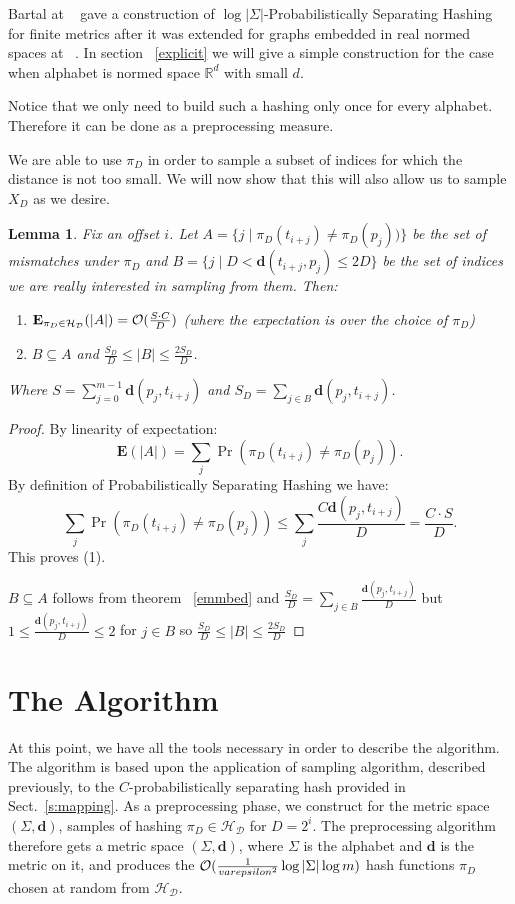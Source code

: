 \documentclass[11pt]{article}
\newcommand{\calO}{{\cal{O}}}
\newtheorem{lem}[thm]{Lemma}
\newcommand{\envert}[1]{\left\lvert#1\right\rvert}
\let\abs=\envert
\newcommand{\bfE}{\textbf{E}}
\newcommand{\dist}{\textbf{d}}
\begin{document}
Bartal at ~\cite{Bar96} gave a construction of $\log
\abs{\Sigma}$-{Probabilistically Separating Hashing } for finite
metrics after it was extended for graphs embedded in real normed
spaces at ~\cite{CCGGP98}. In section ~\ref{explicit} we will give
a simple construction for the case when alphabet is normed space
$\mathbb{R}^d$ with small $d$.

Notice that we only need to build such a hashing only once for
every alphabet. Therefore it can be done as a preprocessing
measure.



We are able to use $\pi_D$ in order to sample a subset of indices
for which the distance is not too small. We will now show that this
will also allow us to sample $X_D$ as we desire.

\begin{lem} \label{map}
Fix an offset $i$. Let $A=\{j\mid \pi_D(t_{i+j})\neq \pi_D(p_j)) \}$
be the set of mismatches under $\pi_D$ and $B=\{j\mid
D<\dist(t_{i+j},p_j)\leq 2D \}$ be the set of indices we are really
interested in sampling from them. Then:
\begin{enumerate}
\item $\bfE_{\pi_D\in \mathcal{H_D}}(\abs{A})=\calO(\frac{S\cdot C}{D})$ (where the
expectation is over the choice of $\pi_D$)
\item $B\subseteq A$ and $\frac{S_D}{D}\leq \abs{B} \leq \frac{2S_D}{D}$.
\end{enumerate}
Where $S=\sum_{j=0}^{m-1}\dist(p_j,t_{i+j})$ and $S_D=\sum_{j\in
B}\dist(p_j,t_{i+j})$.
\end{lem}
\begin{proof}
By linearity of expectation:
$$\bfE(\abs{A})=\sum_j\Pr(\pi_D(t_{i+j})\neq \pi_D(p_j)).$$
By definition of Probabilistically Separating Hashing we have:
\begin{equation*}
\sum_j\Pr(\pi_D(t_{i+j})\neq \pi_D(p_j))\leq \sum_j
\frac{C\dist(p_j,t_{i+j})}{D}=\frac{C\cdot S}{D}.
\end{equation*}
 This proves (1).

$B\subseteq A$ follows from theorem ~\ref{emmbed} and
$\frac{S_D}{D}=\sum_{j\in B}\frac{\dist(p_j,t_{i+j})}{D}$ but
$1\leq\frac{\dist(p_j,t_{i+j})}{D}\leq 2$ for $j \in B$ so
$\frac{S_D}{D}\leq \abs{B} \leq \frac{2S_D}{D} $
\end{proof}

\section{The Algorithm}
At this point, we have all the tools necessary in order to describe
the algorithm. The algorithm is based upon the application of
sampling algorithm, described previously,
 to the $C$-probabilistically separating hash provided in Sect.~\ref{s:mapping}.
 As a preprocessing phase, we construct for the metric space $(\Sigma,\dist)$, samples of hashing $\pi_D \in  \mathcal{H_D}$ for $D=2^i$.
The preprocessing algorithm therefore gets a metric space
$(\Sigma,\dist)$, where $\Sigma$ is the alphabet and $\dist$ is
the metric on it, and produces the
$\calO(\frac{1}{varepsilon^2}\log{\abs{\Sigma} \log m})$ hash
functions $\pi_D$ chosen at random from $\mathcal{H_D}$.
\end{document}
